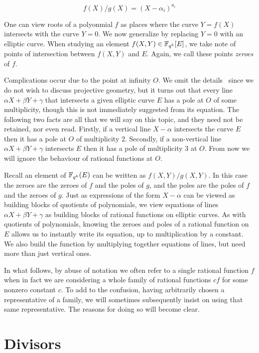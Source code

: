 \[ f(X)/g(X) = (X-\alpha_i)^{a_i} \]

One can view roots of a polyonmial $f$
as places where the curve $Y = f(X)$
intersects with the curve $Y = 0$. We now generalize by replacing $Y=0$
with an elliptic curve.
When studying an element $f(X,Y) \in \mathbb{F}_{q^k}[E]$, we take note of points of
intersection between $f(X,Y)$ and $E$.
Again, we call these points \emph{zeroes} of $f$.

Complications occur due to the point at infinity $O$.
We omit the details~\cite{silverman} since we do not wish to discuss
projective geometry, but it turns out that
every line
$\alpha X + \beta Y + \gamma$
that intersects a given elliptic curve $E$ has a pole
at $O$ of some multiplicity, though this is not immediately suggested
from its equation.
The following two facts are all that we will
say on this topic, and they need not be retained, nor even read.
Firstly, if
a vertical line $X-\alpha$ intersects the curve $E$ then it has a pole
at $O$ of multiplicity 2. Secondly, if a non-vertical line
$\alpha X + \beta Y + \gamma$ intersects $E$ then
it has a pole of multiplicity 3 at $O$.
From now we will ignore the behaviour of rational functions at $O$.

Recall an element of $\mathbb{F}_{q^k}(E)$ can be written as $f(X,Y)/g(X,Y)$.
In this case the zeroes are the zeroes of $f$ and the poles of $g$,
and the poles are the poles of $f$ and the zeroes of $g$.
Just as expressions of the form $X-\alpha$ can be viewed as building blocks of
quotients of polynomials, we view equations of lines
$\alpha X + \beta Y + \gamma$ as building blocks of rational functions
on elliptic curves.
As with quotients of polynomials, knowing the zeroes and poles of
a rational function on $E$ allows us to instantly write its equation,
up to multiplication by a constant. We also build the function by
multiplying together equations of lines, but need more than just
vertical ones.

In what follows,
by abuse of notation we often refer to a single rational function
$f$ when in fact we are considering a whole family of rational functions
$c f$ for some nonzero constant $c$. To add to the confusion, having
arbitrarily chosen a representative of a family, we will sometimes subsequently
insist on using that same representative. The reasons for doing so
will become clear.

\section {Divisors}

